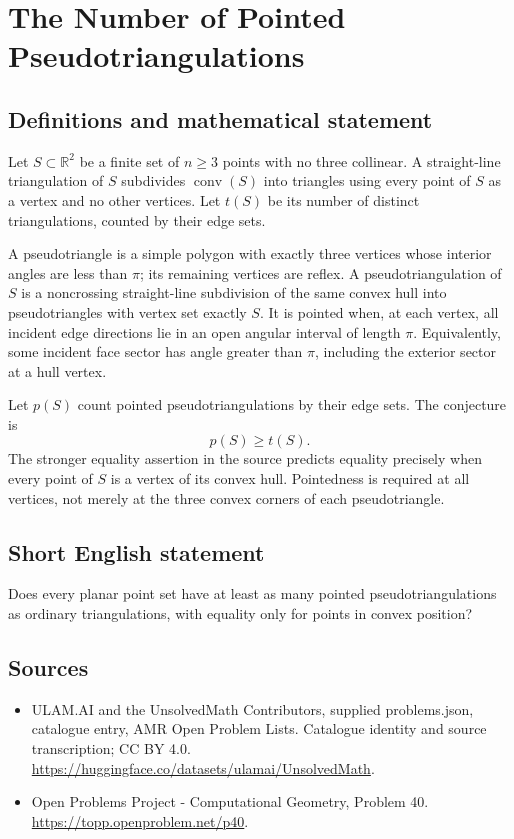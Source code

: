 \documentclass[11pt,a4paper]{article}
\begin{document}
\section*{The Number of Pointed Pseudotriangulations}\label{statement}

\subsection{Definitions and mathematical statement}
Let $S\subset\mathbb R^2$ be a finite set of $n\ge3$ points with no
three collinear. A straight-line triangulation of $S$ subdivides
$\operatorname{conv}(S)$ into triangles using every point of $S$ as
a vertex and no other vertices. Let $t(S)$ be its number of distinct
triangulations, counted by their edge sets.

A pseudotriangle is a simple polygon with exactly three vertices
whose interior angles are less than $\pi$; its remaining vertices
are reflex. A pseudotriangulation of $S$ is a noncrossing straight-line
subdivision of the same convex hull into pseudotriangles with vertex
set exactly $S$. It is pointed when, at each vertex, all incident
edge directions lie in an open angular interval of length $\pi$.
Equivalently, some incident face sector has angle greater than $\pi$,
including the exterior sector at a hull vertex.

Let $p(S)$ count pointed pseudotriangulations by their edge sets.
The conjecture is
\[
                            p(S)\ge t(S).
\]
The stronger equality assertion in the source predicts equality
precisely when every point of $S$ is a vertex of its convex hull.
Pointedness is required at all vertices, not merely at the three
convex corners of each pseudotriangle.
\subsection{Short English statement}
Does every planar point set have at least as many pointed
pseudotriangulations as ordinary triangulations, with equality only
for points in convex position?
\subsection{Sources}
\begin{itemize}
\item[S1] ULAM.AI and the UnsolvedMath Contributors, supplied problems.json, catalogue entry, AMR Open Problem Lists. Catalogue identity and source transcription; CC BY 4.0.
\url{https://huggingface.co/datasets/ulamai/UnsolvedMath}.
\item[S2] Open Problems Project - Computational Geometry, Problem 40. 
\url{https://topp.openproblem.net/p40}.
\end{itemize}
\end{document}
